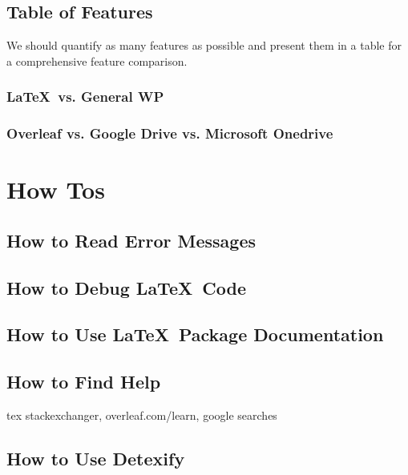 \documentclass[12pt]{article}
\begin{document}
\subsection{Table of Features}%
\label{feat-comp.table}

We should quantify as many features as possible and present them in a table for a comprehensive feature comparison.

\subsubsection{\LaTeX\ vs. General WP}%
\label{feat-comp.table.latex-vs-wp}

\subsubsection{Overleaf vs. Google Drive vs. Microsoft Onedrive}%
\label{feat-comp.table.collab-solns}

\section{How Tos}%
\label{how-to}

\subsection{How to Read Error Messages}%
\label{how-to.error-messages}

\subsection{How to Debug \LaTeX\ Code}%
\label{how-to.debug}

\subsection{How to Use \LaTeX\ Package Documentation}%
\label{how-to.package-docs}

\subsection{How to Find Help}%
\label{how-to.help}

tex stackexchanger, overleaf.com/learn, google searches

\subsection{How to Use Detexify}%
\label{how-to.detexify}
\end{document}
